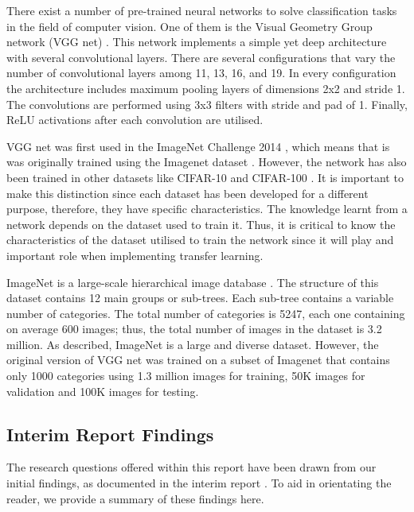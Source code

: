 \documentclass{article}
\begin{document}
There exist a number of pre-trained neural networks to solve classification tasks in the field of computer vision. One of them is the Visual Geometry Group network (VGG net) \cite{DBLP:journals/corr/SimonyanZ14a}. This network implements a simple yet deep architecture with several convolutional layers. There are several configurations that vary the number of convolutional layers among 11, 13, 16, and 19. In every configuration the architecture includes maximum pooling layers of dimensions 2x2 and stride 1. The convolutions are performed using 3x3 filters with stride and pad of 1. Finally, ReLU activations after each convolution are utilised.

VGG net was first used in the ImageNet Challenge 2014 \cite{DBLP:journals/corr/SimonyanZ14a}, which means that is was originally trained using the Imagenet dataset \cite{deng2009imagenet}. However, the network has also been trained in other datasets like CIFAR-10 \cite{krizhevsky2014cifar} and CIFAR-100 \cite{CIFAR-100}. It is important to make this distinction since each dataset has been developed for a different purpose, therefore, they have specific characteristics. The knowledge learnt from a network depends on the dataset used to train it. Thus, it is critical to know the characteristics of the dataset utilised to train the network since it will play and important role when implementing transfer learning.

ImageNet is a large-scale hierarchical image database \cite{ImageNet}. The structure of this dataset contains 12 main groups or sub-trees. Each sub-tree contains a variable number of categories. The total number of categories is 5247, each one containing on average 600 images; thus, the total number of images in the dataset is 3.2 million. As described, ImageNet is a large and diverse dataset. However, the original version of VGG net was trained on a subset of Imagenet that contains only 1000 categories using 1.3 million images for training, 50K images for validation and 100K images for testing.

\subsection{Interim Report Findings}
\label{sec:findings}

The research questions offered within this report have been drawn from our initial findings, as documented in the interim report \cite{interim-report}. To aid in orientating the reader, we provide a summary of these findings here.
\end{document}
